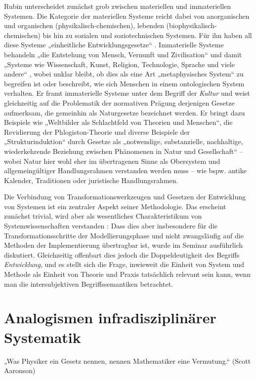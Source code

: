 \documentclass[a4paper,11pt]{article}
\begin{document}
Rubin unterscheidet zunächst grob zwischen materiellen und immateriellen
Systemen. Die Kategorie der materiellen Systeme reicht dabei von anorganischen
und organischen (physikalisch-chemischen), lebenden
(biophysikalisch-chemischen) bis hin zu sozialen und soziotechnischen
Systemen.  Für ihn haben all diese Systeme „einheitliche Entwicklungsgesetze“
\cite{Rubin2002}. Immaterielle Systeme behandeln „die Entstehung von Mensch,
Vernunft und Zivilisation“ \cite{Rubin2006} und damit „Systeme wie
Wissenschaft, Kunst, Religion, Technologie, Sprache und viele andere“
\cite{Rubin2006}, wobei unklar bleibt, ob dies als eine Art „metaphysisches
System“ zu begreifen ist oder beschreibt, wie sich Menschen in einem
ontologischen System verhalten. Er framt immaterielle Systeme unter dem
Begriff der \emph{Kultur} und weist gleichzeitig auf die Problematik der
normativen Prägung derjenigen Gesetze aufmerksam, die gemeinhin als
Naturgesetze bezeichnet werden. Er bringt dazu Beispiele wie „Weltbilder als
Schlachtfeld von Theorien und Menschen“, die Revidierung der
Phlogiston-Theorie und diverse Beispiele der „Strukturinduktion“ durch Gesetze
als „notwendige, substanzielle, nachhaltige, wiederkehrende Beziehung zwischen
Phänomenen in Natur und Gesellschaft“ -- wobei Natur hier wohl eher im
übertragenen Sinne als Obersystem und allgemeingültiger Handlungsrahmen
verstanden werden muss -- wie bspw. antike Kalender, Traditionen oder
juristische Handlungsrahmen.

Die Verbindung von Transformationswerkzeugen und Gesetzen der Entwicklung von
Systemen ist ein zentraler Aspekt seiner Methodologie. Das erscheint zunächst
trivial, wird aber als wesentliches Charakteristikum von Systemwissenschaften
verstanden \cite{Kleemann2020}: Dass dies aber insbesondere für die
Transformationsschritte der Modellierungsphase und nicht zwangsläufig auf die
Methoden der Implementierung übertragbar ist, wurde im Seminar ausführlich
diskutiert. Gleichzeitig offenbart dies jedoch die Doppeldeutigkeit des
Begriffs \emph{Entwicklung}, und es stellt sich die Frage, inwieweit die
Einheit von System und Methode als Einheit von Theorie und Praxis tatsächlich
relevant sein kann, wenn man die intersubjektiven Begriffssemantiken
betrachtet.

\section{Analogismen infradisziplinärer Systematik}
„Was Physiker ein Gesetz nennen, nennen Mathematiker eine Vermutung.“ (Scott
Aaronson)
\end{document}

